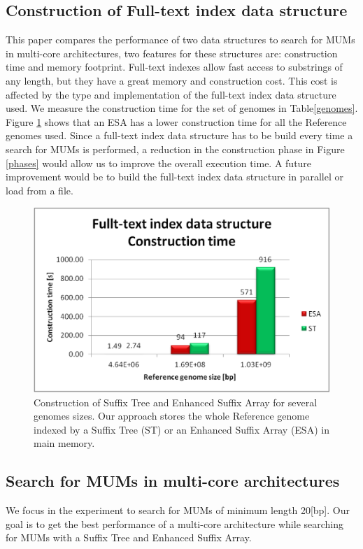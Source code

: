 \documentclass[runningheads,a4paper]{llncs}
\begin{document}
\subsection{Construction of Full-text index data structure}
This paper compares the performance of two data structures to search for MUMs in multi-core architectures, two features for these structures are: construction time and memory footprint. Full-text indexes allow fast access to substrings of any length, but they have a great memory and construction cost. This cost is affected by the type and implementation of the full-text index data structure used. 
We measure the construction time for the set of genomes in Table\ref{genomes}. Figure \ref{fig:construction} shows that an ESA has a lower construction time for all the Reference genomes used. Since a full-text index data structure has to be build every time a search for MUMs is performed, a reduction in the construction phase in Figure \ref{phases} would allow us to improve the overall execution time. A future improvement would be to build the full-text index data structure in parallel or load from a file.
 \begin{figure}[H]
  \centering
  \includegraphics[scale=0.3]{construction.eps}
  \caption{Construction of Suffix Tree and Enhanced Suffix Array for several genomes sizes. Our approach stores the whole Reference genome indexed by a Suffix Tree (ST) or an Enhanced Suffix Array (ESA) in main memory.}
  \label{fig:construction}
 \end{figure}  
 \subsection{Search for MUMs in multi-core architectures}
We focus in the experiment to search for MUMs of minimum length 20[bp]. Our goal is to get the best performance of a multi-core architecture while searching for MUMs with a Suffix Tree and Enhanced Suffix Array.
\end{document}

